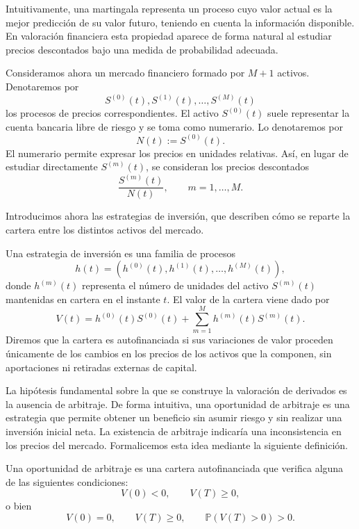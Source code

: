 Intuitivamente, una martingala representa un proceso cuyo valor actual es la mejor predicción de su valor futuro, teniendo en cuenta la información disponible. En valoración financiera esta propiedad aparece de forma natural al estudiar precios descontados bajo una medida de probabilidad adecuada.

Consideramos ahora un mercado financiero formado por \(M+1\) activos. Denotaremos por
\[
S^{(0)}(t),S^{(1)}(t),\ldots,S^{(M)}(t)
\]
los procesos de precios correspondientes. El activo \(S^{(0)}(t)\) suele representar la cuenta bancaria libre de riesgo y se toma como numerario. Lo denotaremos por
\[
N(t):=S^{(0)}(t).
\]
El numerario permite expresar los precios en unidades relativas. Así, en lugar de estudiar directamente \(S^{(m)}(t)\), se consideran los precios descontados
\[
\frac{S^{(m)}(t)}{N(t)}, \qquad m=1,\ldots,M.
\]

Introducimos ahora las estrategias de inversión, que describen cómo se reparte la cartera entre los distintos activos del mercado.

\begin{definition}
\label{def:estrategia-inversion}
Una estrategia de inversión es una familia de procesos
\[
h(t)=\left(h^{(0)}(t),h^{(1)}(t),\ldots,h^{(M)}(t)\right),
\]
donde \(h^{(m)}(t)\) representa el número de unidades del activo \(S^{(m)}(t)\) mantenidas en cartera en el instante \(t\). El valor de la cartera viene dado por
\[
V(t)=h^{(0)}(t)S^{(0)}(t)+\sum_{m=1}^{M}h^{(m)}(t)S^{(m)}(t).
\]
Diremos que la cartera es autofinanciada si sus variaciones de valor proceden únicamente de los cambios en los precios de los activos que la componen, sin aportaciones ni retiradas externas de capital.
\end{definition}

La hipótesis fundamental sobre la que se construye la valoración de derivados es la ausencia de arbitraje. De forma intuitiva, una oportunidad de arbitraje es una estrategia que permite obtener un beneficio sin asumir riesgo y sin realizar una inversión inicial neta. La existencia de arbitraje indicaría una inconsistencia en los precios del mercado. Formalicemos esta idea mediante la siguiente definición.

\begin{definition}
\label{def:oportunidad-arbitraje}
Una oportunidad de arbitraje es una cartera autofinanciada que verifica alguna de las siguientes condiciones:
\[
V(0)<0,\qquad V(T)\geq 0,
\]
o bien
\[
V(0)=0,\qquad V(T)\geq 0,\qquad 
\mathbb{P}(V(T)>0)>0.
\]
\end{definition}

